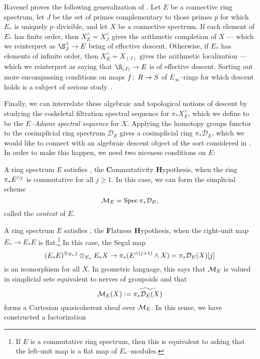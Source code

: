 \begin{remark}
Ravenel proves the following generalization of .  Let $E$ be a connective ring spectrum, let $J$ be the set of primes complementary to those primes $p$ for which $E_*$ is uniquely $p$--divisible, and let $X$ be a connective spectrum.  If each element of $E_*$ has finite order, then $X^\wedge_E = X^\wedge_J$ gives the arithmetic completion of $X$ --- which we reinterpret as $\S^\wedge_J \to E$ being of effective descent.  Otherwise, if $E_*$ has elements of infinite order, then $X^\wedge_E = X_{(J)}$ gives the arithmetic localization --- which we reinterpret as saying that $\S_{(J)} \to E$ is of effective descent.  Sorting out more encompassing conditions on maps $f\colon\thinspace R \to S$ of $E_\infty$--rings for which descent holds is a subject of serious study~\cite[Appendix D]{LurieSAG}.
\end{remark}

Finally, we can interrelate these algebraic and topological notions of descent by studying the coskeletal filtration spectral sequence for $\pi_* X^\wedge_E$, which we define to be the \textit{$E$--Adams spectral sequence} for $X$.  Applying the homotopy groups functor to the cosimplicial ring spectrum $\mathcal D_E$ gives a cosimplicial ring $\pi_* \mathcal D_E$, which we would like to connect with an algebraic descent object of the sort considered in .  In order to make this happen, we need two niceness conditions on $E$:

\begin{definition}
A ring spectrum $E$ satisfies \CH, the \textbf Commutativity \textbf Hypothesis, when the ring $\pi_* E^{\wedge j}$ is commutative for all $j \ge 1$.  In this case, we can form the simplicial scheme \[\mathcal{M}_{E} = \operatorname{Spec} \pi_* \mathcal D_E,\] called the \textit{context} of $E$.
\end{definition}

\begin{definition}
A ring spectrum $E$ satisfies \FH, the \textbf Flatness \textbf Hypothesis, when the right-unit map $E_* \to E_* E$ is flat.\footnote{If $E$ is a commutative ring spectrum, then this is equivalent to asking that the left-unit map is a flat map of $E_*$--modules.}  In this case, the Segal map \[(E_* E)^{\otimes_{E_*} j} \otimes_{E_*} E_* X \to \pi_*(E^{\wedge (j+1)} \wedge X) = \pi_* \mathcal D_E(X)[j]\] is an isomorphism for all $X$.  In geometric language, this says that $\mathcal{M}_{E}$ is valued in simplicial sets equivalent to nerves of groupoids and that \[\mathcal{M}_{E}(X) := \widetilde{\pi_* \mathcal D_E(X)}\] forms a Cartesian quasicoherent sheaf over $\mathcal{M}_{E}$.  In this sense, we have constructed a factorization
\begin{center}
\end{center}
\end{definition}

